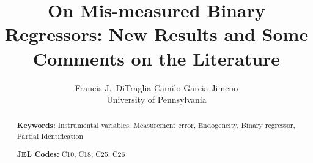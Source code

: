 \documentclass[12pt]{article}
\title{On Mis-measured Binary Regressors: New Results and Some Comments on the Literature}
\author{Francis J.\ DiTraglia  \hspace{2em} Camilo Garcia-Jimeno\\
\normalsize University of Pennsylvania}
\begin{document}
\maketitle


\begin{abstract}
  \singlespacing
	

  	\bigskip
	\noindent\textbf{Keywords:} Instrumental variables, Measurement error, Endogeneity, Binary regressor, Partial Identification

	\medskip
  \noindent\textbf{JEL Codes:} C10, C18, C25, C26
\end{abstract}




%
%
%

%
%




%
\end{document}
